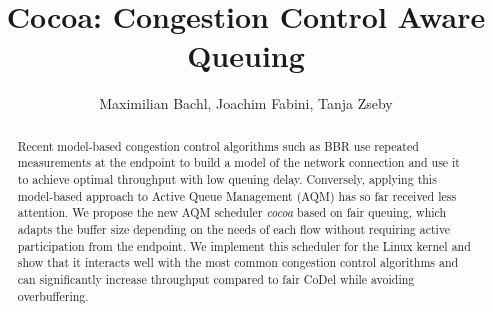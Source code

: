 \documentclass[sigconf, 10pt, letterpaper,dvipsnames\ifx\removeHeaders\tempYes ,nonacm\fi]{acmart}
\newcommand{\codel}{CoDel}
\begin{document}
\title{Cocoa: Congestion Control Aware Queuing}



\begin{abstract}
Recent model-based congestion control algorithms such as BBR use repeated measurements at the endpoint to build a model of the network connection and use it to achieve optimal throughput with low queuing delay. Conversely, applying this model-based approach to Active Queue Management (AQM) has so far received less attention. We propose the new AQM scheduler \textit{cocoa} based on fair queuing, which adapts the buffer size depending on the needs of each flow without requiring active participation from the endpoint. We implement this scheduler for the Linux kernel and show that it interacts well with the most common congestion control algorithms and can significantly increase throughput compared to fair \codel{} while avoiding overbuffering.
\end{abstract}

\author{Maximilian Bachl, Joachim Fabini, Tanja Zseby}



\end{document}
